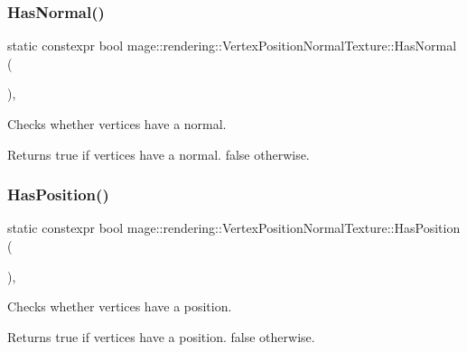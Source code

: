 \subsubsection{\texorpdfstring{Has\+Normal()}{HasNormal()}}
{\footnotesize\ttfamily static constexpr bool mage\+::rendering\+::\+Vertex\+Position\+Normal\+Texture\+::\+Has\+Normal (\begin{DoxyParamCaption}{ }\end{DoxyParamCaption})\hspace{0.3cm}{\ttfamily [static]}, {\ttfamily [noexcept]}}

Checks whether vertices have a normal.

\begin{DoxyReturn}{Returns}
{\ttfamily true} if vertices have a normal. {\ttfamily false} otherwise. 
\end{DoxyReturn}
\hypertarget{structmage_1_1rendering_1_1_vertex_position_normal_texture_a5cde27475fae5b650d91ccba4e6a2a8d}{}\label{structmage_1_1rendering_1_1_vertex_position_normal_texture_a5cde27475fae5b650d91ccba4e6a2a8d} 
\subsubsection{\texorpdfstring{Has\+Position()}{HasPosition()}}
{\footnotesize\ttfamily static constexpr bool mage\+::rendering\+::\+Vertex\+Position\+Normal\+Texture\+::\+Has\+Position (\begin{DoxyParamCaption}{ }\end{DoxyParamCaption})\hspace{0.3cm}{\ttfamily [static]}, {\ttfamily [noexcept]}}

Checks whether vertices have a position.

\begin{DoxyReturn}{Returns}
{\ttfamily true} if vertices have a position. {\ttfamily false} otherwise. 
\end{DoxyReturn}
\hypertarget{structmage_1_1rendering_1_1_vertex_position_normal_texture_afebe9b59273a84b1ad78f2209d8f500e}{}\label{structmage_1_1rendering_1_1_vertex_position_normal_texture_afebe9b59273a84b1ad78f2209d8f500e} 
